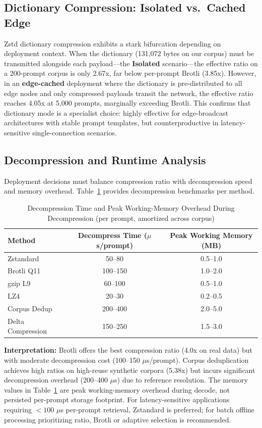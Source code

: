 \documentclass[10pt,conference]{IEEEtran}
\begin{document}
\subsection{Dictionary Compression: Isolated vs.~Cached Edge}
Zstd dictionary compression exhibits a stark bifurcation depending on deployment context. When the dictionary (131,072 bytes on our corpus) must be transmitted alongside each payload---the \textbf{Isolated} scenario---the effective ratio on a 200-prompt corpus is only 2.67x, far below per-prompt Brotli (3.85x). However, in an \textbf{edge-cached} deployment where the dictionary is pre-distributed to all edge nodes and only compressed payloads transit the network, the effective ratio reaches 4.05x at 5,000 prompts, marginally exceeding Brotli. This confirms that dictionary mode is a specialist choice: highly effective for edge-broadcast architectures with stable prompt templates, but counterproductive in latency-sensitive single-connection scenarios.

\subsection{Decompression and Runtime Analysis}
Deployment decisions must balance compression ratio with decompression speed and memory overhead. Table~\ref{tab:decompress} provides decompression benchmarks per method.

\begin{table}[h]
\centering
\renewcommand{\arraystretch}{1.1}
\begin{tabular}{|l|c|c|}
\hline
\textbf{Method} & \textbf{Decompress Time ($\mu$s/prompt)} & \textbf{Peak Working Memory (MB)} \\
\hline
Zstandard & 50--80 & 0.5--1.0 \\
Brotli Q11 & 100--150 & 1.0--2.0 \\
gzip L9 & 60--100 & 0.5--1.0 \\
LZ4 & 20--30 & 0.2--0.5 \\
Corpus Dedup & 200--400 & 2.0--5.0 \\
Delta Compression & 150--250 & 1.5--3.0 \\
\hline
\end{tabular}
\caption{Decompression Time and Peak Working-Memory Overhead During Decompression (per prompt, amortized across corpus)}
\label{tab:decompress}

\end{table}

\textbf{Interpretation:} Brotli offers the best compression ratio (4.0x on real data) but with moderate decompression cost (100--150 $\mu$s/prompt). Corpus deduplication achieves high ratios on high-reuse synthetic corpora (5.38x) but incurs significant decompression overhead (200--400 $\mu$s) due to reference resolution. The memory values in Table~\ref{tab:decompress} are peak working-memory overhead during decode, not persisted per-prompt storage footprint. For latency-sensitive applications requiring $<100$ $\mu$s per-prompt retrieval, Zstandard is preferred; for batch offline processing prioritizing ratio, Brotli or adaptive selection is recommended.
\end{document}

